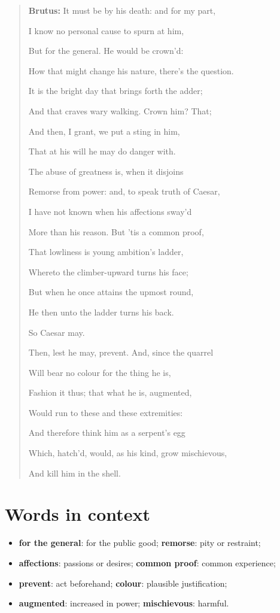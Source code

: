 \documentclass[11pt]{article}
\newenvironment{playpassage}{\begin{quote}\small\setlength{\parskip}{0.04em}\setlength{\parindent}{0pt}}{\end{quote}}
\newcommand{\speaker}[1]{\textbf{#1:}}
\begin{document}
\begin{playpassage}
\speaker{Brutus} It must be by his death: and for my part,\par
I know no personal cause to spurn at him,\par
But for the general. He would be crown'd:\par
How that might change his nature, there's the question.\par
It is the bright day that brings forth the adder;\par
And that craves wary walking. Crown him? That;\par
And then, I grant, we put a sting in him,\par
That at his will he may do danger with.\par
The abuse of greatness is, when it disjoins\par
Remorse from power: and, to speak truth of Caesar,\par
I have not known when his affections sway'd\par
More than his reason. But 'tis a common proof,\par
That lowliness is young ambition's ladder,\par
Whereto the climber-upward turns his face;\par
But when he once attains the upmost round,\par
He then unto the ladder turns his back.\par

So Caesar may.\par
Then, lest he may, prevent. And, since the quarrel\par
Will bear no colour for the thing he is,\par
Fashion it thus; that what he is, augmented,\par
Would run to these and these extremities:\par
And therefore think him as a serpent's egg\par
Which, hatch'd, would, as his kind, grow mischievous,\par
And kill him in the shell.
\end{playpassage}
\section*{Words in context}
\begin{itemize}
\item \textbf{for the general}: for the public good; \textbf{remorse}: pity or restraint;
\item \textbf{affections}: passions or desires; \textbf{common proof}: common experience;
\item \textbf{prevent}: act beforehand; \textbf{colour}: plausible justification;
\item \textbf{augmented}: increased in power; \textbf{mischievous}: harmful.
\end{itemize}
\end{document}
